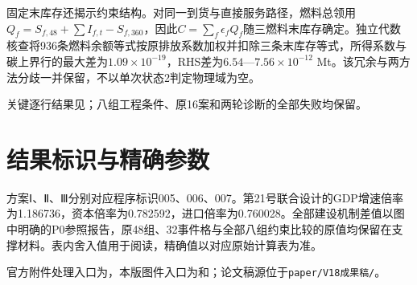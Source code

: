 固定末库存还揭示约束结构。对同一到货与直接服务路径，燃料总领用$Q_f=S_{f,48}+\sum I_{f,t}-S_{f,360}$，因此$C=\sum_f\epsilon_fQ_f$随三燃料末库存确定。独立代数核查将936条燃料余额等式按原排放系数加权并扣除三条末库存等式，所得系数与碳上界行的最大差为$1.09\times10^{-19}$，RHS差为$6.54$—$7.56\times10^{-12}$ Mt。该冗余与两方法分歧一并保留，不以单次状态2判定物理域为空。

\noindent 关键逐行结果见；八组工程条件、原16案和两轮诊断的全部失败均保留。\par

\section{结果标识与精确参数}
方案Ⅰ、Ⅱ、Ⅲ分别对应程序标识005、006、007。第21号联合设计的GDP增速倍率为1.186736，资本倍率为0.782592，进口倍率为0.760028。全部建设机制差值以图中明确的P0参照报告，原48组、32事件格与全部八组约束比较的原值均保留在支撑材料。表内舍入值用于阅读，精确值以对应原始计算表为准。

官方附件处理入口为，本版图件入口为和；论文稿源位于\texttt{paper/V18成果稿/}。
